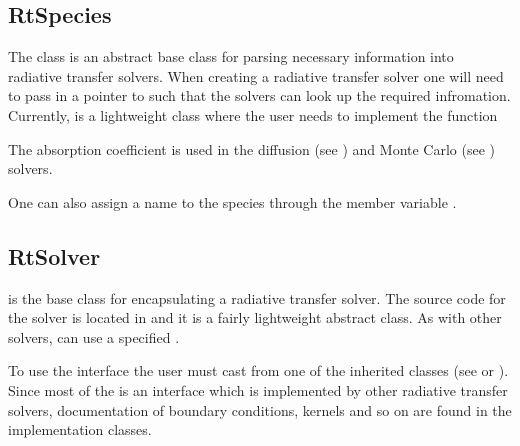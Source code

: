 \documentclass[letterpaper,10pt,english]{sphinxmanual}
\begin{document}
\subsection{RtSpecies}
\label{\detokenize{Solvers/RTE:rtspecies}}\label{\detokenize{Solvers/RTE:chap-rtspecies}}
The class  is an abstract base class for parsing necessary information into radiative transfer solvers.
When creating a radiative transfer solver one will need to pass in a pointer to  such that the solvers can look up the required infromation.
Currently,  is a lightweight class where the user needs to implement the function

\begin{sphinxVerbatim}[commandchars=\\\{\},formatcom=\scriptsize]
       
\end{sphinxVerbatim}

The absorption coefficient is used in the diffusion (see {\hyperref[\detokenize{Solvers/RTE:chap-diffusionrte}]{}}) and Monte Carlo (see {\hyperref[\detokenize{Solvers/RTE:chap-montecarlorte}]{}}) solvers.

One can also assign a name to the species through the member variable .


\subsection{RtSolver}
\label{\detokenize{Solvers/RTE:rtsolver}}\label{\detokenize{Solvers/RTE:chap-rtsolver}}
 is the base class for encapsulating a radiative transfer solver.
The source code for the solver is located in  and it is a fairly lightweight abstract class.
As with other solvers,  can use a specified {\hyperref[\detokenize{Source/Realm:chap-realm}]{}}.

To use the  interface the user must cast from one of the inherited classes (see {\hyperref[\detokenize{Solvers/RTE:chap-diffusionrte}]{}} or {\hyperref[\detokenize{Solvers/RTE:chap-montecarlorte}]{}}).
Since most of the  is an interface which is implemented by other radiative transfer solvers, documentation of boundary conditions, kernels and so on are found in the implementation classes.
\end{document}
